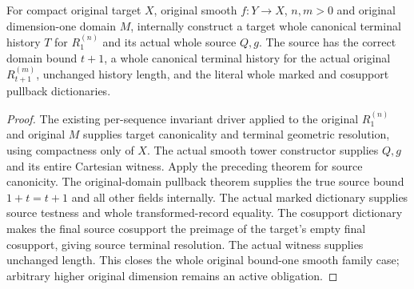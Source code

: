 \begin{theorem}
\label{hir:smooth-original-curve-full-family-resolution}
\leanok
{}
For compact original target $X$, original smooth $f:Y\to X$, $n,m>0$ and
original dimension-one domain $M$, internally construct a target whole
canonical terminal history $T$ for $R^{(n)}_1$ and its actual whole source
$Q,g$. The source has the correct domain bound $t+1$, a whole canonical
terminal history for the actual original $R^{(m)}_{t+1}$, unchanged history
length, and the literal whole marked and cosupport pullback dictionaries.
\end{theorem}
\begin{proof}
The existing per-sequence invariant driver applied to the original
$R^{(n)}_1$ and original $M$ supplies target canonicality and terminal
geometric resolution, using compactness only of $X$. The actual smooth
tower constructor supplies $Q,g$ and its entire Cartesian witness.
Apply the preceding theorem for source canonicity. The original-domain
pullback theorem supplies the true source bound $1+t=t+1$ and all other
fields internally. The actual marked dictionary supplies source testness
and whole transformed-record equality. The cosupport dictionary makes
the final source cosupport the preimage of the target's empty final
cosupport, giving source terminal resolution. The actual witness supplies
unchanged length. This closes the whole original bound-one smooth family
case; arbitrary higher original dimension remains an active obligation.
\end{proof}
